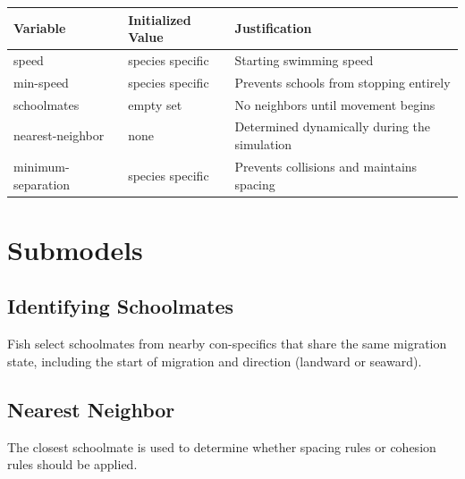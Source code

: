 \documentclass[
]{book}
\begin{document}
\begin{longtable}[]{@{}
  >{\raggedright\arraybackslash}p{}
  >{\raggedright\arraybackslash}p{}
  >{\raggedright\arraybackslash}p{}@{}}
\toprule\noalign{}
\begin{minipage}[b]{\linewidth}\raggedright
Variable
\end{minipage} & \begin{minipage}[b]{\linewidth}\raggedright
Initialized Value
\end{minipage} & \begin{minipage}[b]{\linewidth}\raggedright
Justification
\end{minipage} \\
\midrule\noalign{}
\endhead
\bottomrule\noalign{}
\endlastfoot
speed & species specific & Starting swimming speed \\
min-speed & species specific & Prevents schools from stopping entirely \\
schoolmates & empty set & No neighbors until movement begins \\
nearest-neighbor & none & Determined dynamically during the simulation \\
minimum-separation & species specific & Prevents collisions and maintains spacing \\
\end{longtable}

\section{Submodels}\label{submodels-8}

\subsection{Identifying Schoolmates}\label{identifying-schoolmates}

Fish select schoolmates from nearby con-specifics that share the same
migration state, including the start of migration and direction
(landward or seaward).

\subsection{Nearest Neighbor}\label{nearest-neighbor}

The closest schoolmate is used to determine whether spacing rules or
cohesion rules should be applied.
\end{document}
